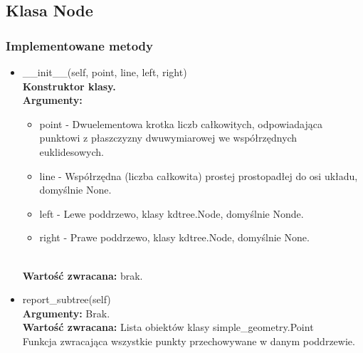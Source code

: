 \documentclass{article}
\begin{document}
        \subsection{Klasa Node}
            \subsubsection{Implementowane metody}
                \begin{itemize}
                    \item \_\_init\_\_(self, point, line, left, right)\\
                        \textbf{Konstruktor klasy.} \\
                        \textbf{Argumenty:} \begin{itemize}
                            \item point - Dwuelementowa krotka liczb całkowitych, odpowiadająca punktowi z płaszczyzny dwuwymiarowej we współrzędnych euklidesowych.
                            \item line - Współrzędna (liczba całkowita) prostej prostopadłej do osi układu, domyślnie None. 
                            \item left - Lewe poddrzewo, klasy kdtree.Node, domyślnie Nonde. 
                            \item right - Prawe poddrzewo, klasy kdtree.Node, domyślnie None.
                        \end{itemize}\\
                        \textbf{Wartość zwracana:} brak.
                    
                    
                    \item report\_subtree(self)\\
                        \textbf{Argumenty:} Brak.\\
                        \textbf{Wartość zwracana:} Lista obiektów klasy simple\_geometry.Point\\
                        Funkcja zwracająca wszystkie punkty przechowywane w danym poddrzewie.
                    

\end{itemize}
\end{document}
